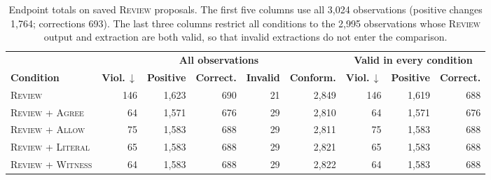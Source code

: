 \documentclass[acmsmall,review]{acmart}
\newcommand{\agree}{\textsc{Agree}}
\newcommand{\allow}{\textsc{Allow}}
\newcommand{\literal}{\textsc{Literal}}
\newcommand{\witness}{\textsc{Witness}}
\newcommand{\review}{\textsc{Review}}
\begin{document}
\begin{table}[H]
\centering
\caption{Endpoint totals on saved \review{} proposals. The first five columns use all 3,024 observations (positive changes 1,764; corrections 693). The last three columns restrict all conditions to the 2,995 observations whose \review{} output and extraction are both valid, so that invalid extractions do not enter the comparison.}\label{tab:L2}
\small
\setlength{\tabcolsep}{3pt}
\begin{tabular}{@{}lrrrrr@{\hspace{9pt}}rrr@{}}
\toprule
 & \multicolumn{5}{c}{\textbf{All observations}} & \multicolumn{3}{c}{\textbf{Valid in every condition}} \\
\cmidrule(lr){2-6}\cmidrule(l){7-9}
\textbf{Condition} & \textbf{Viol.\,$\downarrow$} & \textbf{Positive} & \textbf{Correct.} & \textbf{Invalid} & \textbf{Conform.} & \textbf{Viol.\,$\downarrow$} & \textbf{Positive} & \textbf{Correct.} \\
\midrule
\review{} & 146 & 1,623 & 690 & 21 & 2,849 & 146 & 1,619 & 688 \\
\review{} + \agree{} & 64 & 1,571 & 676 & 29 & 2,810 & 64 & 1,571 & 676 \\
\review{} + \allow{} & 75 & 1,583 & 688 & 29 & 2,811 & 75 & 1,583 & 688 \\
\review{} + \literal{} & 65 & 1,583 & 688 & 29 & 2,821 & 65 & 1,583 & 688 \\
\review{} + \witness{} & 64 & 1,583 & 688 & 29 & 2,822 & 64 & 1,583 & 688 \\
\bottomrule
\end{tabular}
\end{table}
\end{document}
